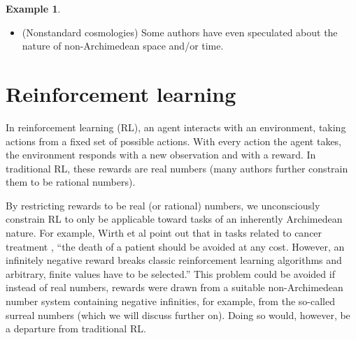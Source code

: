 \documentclass[reqno]{article}
\theoremstyle{definition}
\newtheorem{example}[theorem]{Example}
\begin{document}
\begin{example}
\begin{itemize}
        impossible to measure machine intelligence using real numbers without some
        of those measurements being misleading\footnote{This would solve an open problem
        implicitly stated by Legg and Hutter \cite{legg} when they said of their
        real-number universal intelligence measure: ``...none of these people have
        been able to communicate why the work [on measuring universal intelligence
        using real numbers] is so obviously flawed in any concrete way ...
        If anyone would like to properly explain their position to us in the future,
        we promise not to chase you down the street!''}.
        \item
        (Nonstandard cosmologies)
        Some
        authors
        \cite{al2016surreal} \cite{andreka2012logic}
        \cite{reeder2012infinitesimals} \cite{rosinger2007cosmic} have
        even speculated about the nature of non-Archimedean space and/or
        time.
    \end{itemize}
\end{example}

\section{Reinforcement learning}
\label{reinforcementlearningsection}

In reinforcement learning (RL), an agent interacts with an environment,
taking actions from a fixed set of possible actions. With every action the
agent takes, the environment responds with a new observation and with a
reward. In traditional RL, these rewards are real numbers (many
authors further constrain them to be rational numbers).

By restricting rewards to be real (or rational) numbers, we unconsciously
constrain RL to only be applicable toward tasks of an inherently Archimedean
nature. For example, Wirth et al point out \cite{wirth2017survey} that
in tasks related to cancer treatment \cite{zhao2009reinforcement},
``the death of a patient should be avoided at any cost. However, an
infinitely negative reward breaks classic reinforcement learning algorithms
and arbitrary, finite values have to be selected.'' This problem could be
avoided if instead of real numbers, rewards were drawn from a suitable
non-Archimedean number system containing negative infinities,
for example, from the so-called
surreal numbers (which we will discuss further on). Doing so would, however,
be a departure from traditional RL.
\end{document}
